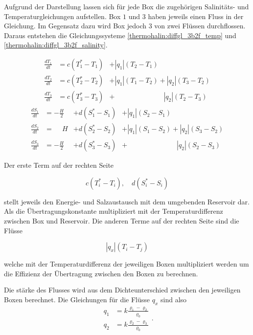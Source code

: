 Aufgrund der Darstellung lassen sich für jede Box die zugehörigen Salinitäts- und Temperaturgleichungen aufstellen. Box $1$ und $3$ haben jeweils einen Fluss in der Gleichung. Im Gegensatz dazu wird Box jedoch $3$ von zwei Flüssen durchflossen. Daraus entstehen die Gleichungssysteme \ref{thermohalin:diffgl_3b2f_temp} und \ref{thermohalin:diffgl_3b2f_salinity}. 

\begin{equation}\label{thermohalin:diffgl_3b2f_temp}
\begin{aligned}
\frac{dT_1}{dt} &= c(T_1^*-T_1)&+|q_1|(T_2-T_1)\phantom{+|q_2|(T_3-T_2)}
\\
\frac{dT_2}{dt} &= c(T_2^*-T_2)&+|q_1|(T_1-T_2)+|q_2|(T_3-T_2)
\\
\frac{dT_3}{dt} &= c(T_3^*-T_3)&+ \phantom{+|q_1|(T_1-T_2)}|q_2|(T_2-T_3)
\end{aligned}
\end{equation}
\begin{equation}\label{thermohalin:diffgl_3b2f_salinity}
\begin{aligned}
\frac{dS_1}{dt} &= -\frac{H}{2} &+ d(S_1^*-S_1)&+|q_1|(S_2-S_1)\phantom{+|q_2|(S_3-S_2)}
\\
\frac{dS_2}{dt} &= \phantom{-}H &+ d(S_2^*-S_2)&+|q_1|(S_1-S_2)+|q_2|(S_3-S_2)	
\\
\frac{dS_3}{dt} &= -\frac{H}{2} &+d(S_3^*-S_3)&+ \phantom{+|q_1|(S_1-S_2)}|q_2|(S_2-S_3)
\end{aligned}
\end{equation}	

Der erste Term auf der rechten Seite

\begin{equation*}
	c(T_i^*-T_i), \quad d(S_i^*-S_i)
\end{equation*}

stellt jeweils den Energie- und Salzaustausch mit dem umgebenden Reservoir dar. Als die Übertragungskonstante multipliziert mit der Temperaturdifferenz zwischen Box und Reservoir. Die anderen Terme auf der rechten Seite sind die Flüsse

\begin{equation*}
	|q_x|(T_i-T_j)
\end{equation*}

 welche mit der Temperaturdifferenz der jeweiligen Boxen multipliziert werden um die Effizienz der Übertragung zwischen den Boxen zu berechnen.  


Die stärke des Flusses wird aus dem Dichteunterschied zwischen den jeweiligen Boxen berechnet. 
Die Gleichungen für die Flüsse $q_x$ sind also 
\begin{equation}
\begin{aligned}
	q_1 &= k\frac{\varrho_1-\varrho_2}{\varrho_0}
	\\
	q_2 &= k\frac{\varrho_2-\varrho_3}{\varrho_0}
\end{aligned}.
\end{equation}

